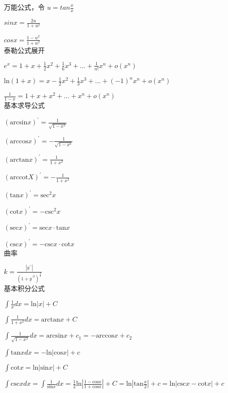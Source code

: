 
万能公式，令 $u = tan\frac{x}{x}$  

$ sinx = \frac{2u}{1+u^2}$ 

$ cosx = \frac{1-u^2}{1+u^2}$ \\

泰勒公式展开 

$ {e}^{x}=1+x+\frac{1}{2}{x}^{2}+\frac{1}{6}{x}^{3}+ \dots + \frac{1}{n!}{x}^{n}+o\left({x}^{n}\right)$

$\mathrm{ln}\left(1+x\right)=x-\frac{1}{2}{x}^{2}+\frac{1}{3}{x}^{3}+ \dots + {\left(-1\right)}^{n}{x}^{n}+o\left({x}^{n}\right)$

$\frac{1}{1-x}=1+x+{x}^{2}+\dots +{x}^{n}+o\left({x}^{n}\right)$ \\

基本求导公式

${\left(\mathrm{arcsin}x\right)}^{\prime }=\frac{1}{\sqrt{1-{x}^{2}}}$

${\left(\mathrm{arccos}x\right)}^{\prime }=-\frac{1}{\sqrt{1-{x}^{2}}}$

${\left(\mathrm{arctan}x\right)}^{\prime }=\frac{1}{1+{x}^{2}}$

${\left(\mathrm{arccot}X\right)}^{\prime }=-\frac{1}{1+{x}^{2}}$

${\left(\mathrm{tan}x\right)}^{\prime }={\mathrm{sec}}^{2}x$

${\left(\mathrm{cot}x\right)}^{\prime }=-{\mathrm{csc}}^{2}x$

${\left(\mathrm{sec}x\right)}^{\prime }=\mathrm{sec}x\cdot \mathrm{tan}x$

${\left(\mathrm{csc}x\right)}^{\prime }=-\mathrm{csc}x\cdot \mathrm{cot}x$ \\

曲率 

$k=\frac{\left|{y}^{\prime \prime }\right|}{{\left(1+{{y}^{\prime }}^{2}\right)}^{\frac{3}{2}}}$ \\

基本积分公式 

$\int \frac{1}{x}dx=\mathrm{ln}\left|x\right|+C$

$\int \frac{1}{1+{x}^{2}}dx=\mathrm{arctan}x+C$

$\int \frac{1}{\sqrt{1-{x}^{2}}}dx=\mathrm{arcsin}x+{c}_{1}=-\mathrm{arccos}x+{c}_{2}$

$\int \mathrm{tan}xdx=-\mathrm{ln}\left|\mathrm{cos}x\right|+c$

$\int \mathrm{cot}x=\mathrm{ln}\left|\mathrm{sin}x\right|+C$

$\int \mathrm{csc}xdx=\int \frac{1}{\mathrm{sin}x}dx=\frac{1}{2}\mathrm{ln}\left|\frac{1-\mathrm{cos}x}{1+\mathrm{cos}x}\right|+C = \mathrm{ln}\left|\mathrm{tan}\frac{x}{2}\right|+c=\mathrm{ln}\left|\mathrm{csc}x-\mathrm{cot}x\right|+c$

